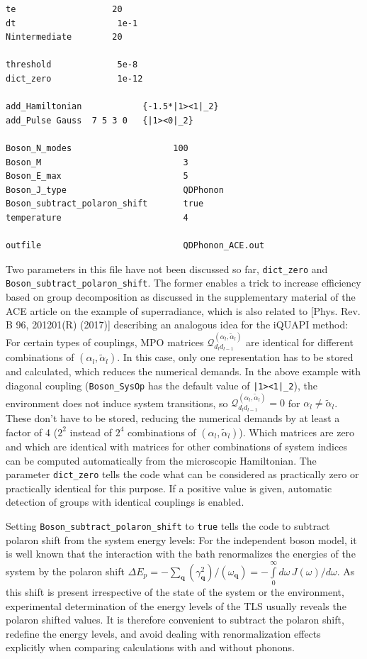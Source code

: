 \documentclass{scrartcl}
\begin{document}
\begin{verbatim}
te                   20
dt                    1e-1
Nintermediate        20

threshold             5e-8
dict_zero             1e-12

add_Hamiltonian            {-1.5*|1><1|_2}
add_Pulse Gauss  7 5 3 0   {|1><0|_2}

Boson_N_modes                    100
Boson_M                            3
Boson_E_max                        5
Boson_J_type                       QDPhonon
Boson_subtract_polaron_shift       true
temperature                        4

outfile                            QDPhonon_ACE.out
\end{verbatim}

Two parameters in this file have not been discussed so far, 
\verb+dict_zero+ and \verb+Boson_subtract_polaron_shift+.
The former enables a trick to increase efficiency based on 
group decomposition as discussed in the supplementary material of the
ACE article on the example of superradiance, which is also related to 
[Phys. Rev. B 96, 201201(R) (2017)] describing an analogous idea for
the iQUAPI method:
For certain types of couplings, MPO matrices 
$\mathcal{Q}_{d_l d_{l-1}}^{(\alpha_l,\tilde{\alpha}_l)}$ are identical
for different combinations of $(\alpha_l,\tilde{\alpha}_l)$. 
In this case, only one representation has to be stored and calculated, which 
reduces the numerical demands. In the above example with diagonal coupling 
(\verb+Boson_SysOp+ has the default value of \verb+|1><1|_2+), the
environment does not induce system transitions, so 
$\mathcal{Q}_{d_l d_{l-1}}^{(\alpha_l,\tilde{\alpha}_l)}=0$ for 
$\alpha_l\neq\tilde{\alpha}_l$. These don't have to be stored, reducing 
the numerical demands by at least a factor of 4 ($2^2$ instead of $2^4$ 
combinations of $(\alpha_l,\tilde{\alpha}_l)$). Which matrices are zero and
which are identical with matrices for other combinations of system indices 
can be computed automatically from the microscopic Hamiltonian. 
The parameter \verb+dict_zero+ tells the code what can be considered as 
practically zero or practically identical for this purpose. If a positive
value is given, automatic detection of groups with identical couplings 
is enabled.

Setting \verb+Boson_subtract_polaron_shift+ to \verb+true+ tells the code
to subtract polaron shift from the system energy levels: 
For the independent boson model, it is well known that the 
interaction with the bath renormalizes the energies of the system
by the polaron shift 
$\Delta E_p=-\sum_{\mathbf{q}}(\gamma^2_{\mathbf{q}})/(\omega_{\mathbf{q}})
=-\int\limits_0^\infty d\omega\, J(\omega) / d\omega$.
As this shift is present irrespective of the state of the system or the 
environment, experimental determination of the energy levels of the TLS
usually reveals the polaron shifted values. It is therefore convenient to
subtract the polaron shift, redefine the energy levels, and avoid dealing 
with renormalization effects explicitly when comparing calculations with
and without phonons. 
\end{document}
